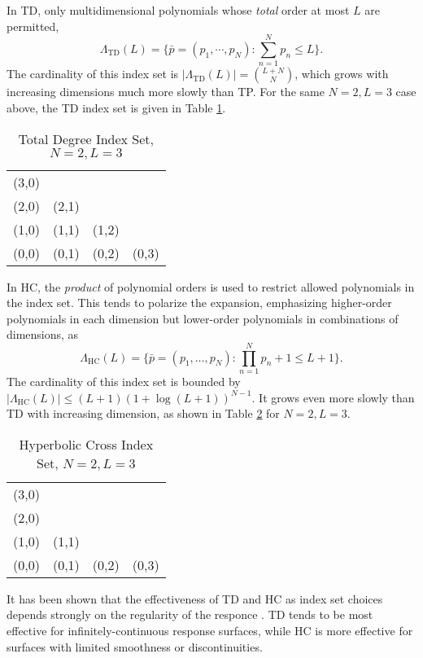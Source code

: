 In TD, only multidimensional polynomials whose \emph{total} order at most $L$ are permitted,
\begin{equation}
  \Lambda_\text{TD}(L)=\Big\{\bar p=(p_1,\cdots,p_N):\sum_{n=1}^N p_n \leq L
\Big\}.
\end{equation}
The cardinality of this index set is $|\Lambda_\text{TD}(L)|={L+N\choose N}$, which grows with increasing
dimensions much more slowly than TP.  For the same $N=2,L=3$ case above, the TD index set is given in Table
\ref{tab:TD}. 

\begin{table}[h]
  \centering
  \begin{tabular}{c c c c}
    (3,0) &       &       &       \\
    (2,0) & (2,1) &       &       \\
    (1,0) & (1,1) & (1,2) &       \\
    (0,0) & (0,1) & (0,2) & (0,3)
  \end{tabular}
  \caption{Total Degree Index Set, $N=2,L=3$}
  \label{tab:TD}
\end{table}

In HC, the \emph{product} of polynomial orders is used to restrict allowed polynomials in the index set.  This
tends to polarize the expansion, emphasizing higher-order polynomials in each dimension but lower-order
polynomials in combinations of dimensions, as
\begin{equation}
  \Lambda_\text{HC}(L)=\Big\{\bar p=(p_1,\ldots,p_N):\prod_{n=1}^N p_n+1 \leq L+1
\Big\}.
\end{equation}
The cardinality of this index set is bounded by $|\Lambda_\text{HC}(L)|\leq (L+1)(1+\log(L+1))^{N-1}$. It
grows even more slowly than TD with increasing dimension, as shown in Table \ref{tab:HC} for $N=2,L=3$.

\begin{table}[h]
  \centering
  \begin{tabular}{c c c c}
    (3,0) &       &       &       \\
    (2,0) &       &       &       \\
    (1,0) & (1,1) &       &       \\
    (0,0) & (0,1) & (0,2) & (0,3)
  \end{tabular}
  \caption{Hyperbolic Cross Index Set, $N=2,L=3$}
  \label{tab:HC}
\end{table}

It has been shown that the effectiveness of TD and HC as index set choices depends strongly on the regularity
of the responce \cite{hctd}.  TD tends to be most effective for infinitely-continuous response surfaces,
while HC is more effective for surfaces with limited smoothness or discontinuities.

